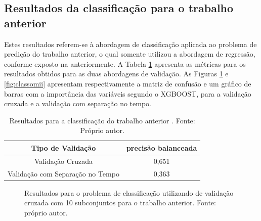 \subsection{Resultados da classificação para o trabalho anterior}

Estes resultados referem-se à abordagem de classificação aplicada ao problema de predição do trabalho anterior, o qual somente utilizou a abordagem de regressão, conforme exposto na anteriormente. A Tabela \ref{tab:results_class} apresenta as métricas para os resultados obtidos para as duas abordagens de validação. As Figuras \ref{fig:classomik} e \ref{fig:classomii} apresentam respectivamente a matriz de confusão e um gráfico de barras com a importância das variáveis segundo o XGBOOST, para a validação cruzada e a validação com separação no tempo.

\begin{table}[h]
\begin{center}
\begin{tabular}{|c|c|}
\hline
Tipo de Validação & precisão balanceada   \\ \hline
Validação Cruzada                   & 0,651    \\ \hline
Validação com Separação no Tempo    & 0,363     \\ \hline
\end{tabular}
\end{center}
\vspace{12pt}
\caption{Resultados para a classificação do trabalho anterior \cite{REZENDE:2009}. Fonte: Próprio autor.}
\label{tab:results_class}
\end{table}

\begin{figure}[h]
\center
\hspace{-2cm}
\caption{Resultados para o problema de classificação utilizando de validação cruzada com 10 subconjuntos para o trabalho anterior. Fonte: próprio autor.}
\label{fig:classomik}
\end{figure}

